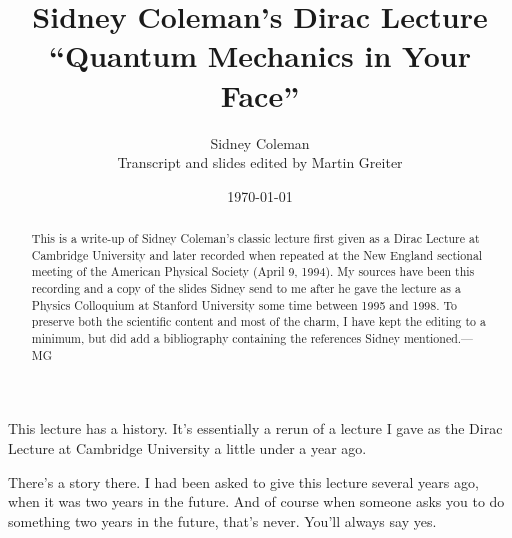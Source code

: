 \documentclass[twocolumn,prb]{revtex4}
\begin{document}
\title{Sidney Coleman's Dirac Lecture ``Quantum Mechanics in Your Face''}
\author{Sidney Coleman\\[6pt]  Transcript and slides edited by Martin Greiter}

\pagestyle{plain}
\date{\today}

\begin{abstract}
This is a write-up of Sidney Coleman's classic lecture first given as a Dirac Lecture at Cambridge University and later recorded when repeated at the New England sectional meeting of the American Physical Society (April 9, 1994).  My sources have been this recording\cite{coleman} and a copy of the slides Sidney send to me after he gave the lecture as a Physics Colloquium at Stanford University some time between 1995 and 1998.  To preserve both the scientific content and most of the charm, I have kept the editing to a minimum, but did add a bibliography containing the references Sidney mentioned.---MG
\end{abstract}

\maketitle

This lecture has a history.
It's essentially a rerun of a lecture I gave as the Dirac Lecture at Cambridge University a little under a year ago.

There's a story there.
I had been asked to give this lecture several years ago, when it was two years in the future. And of course when someone asks you to do something two years in the future, that's never. You'll always say yes.
\end{document}
